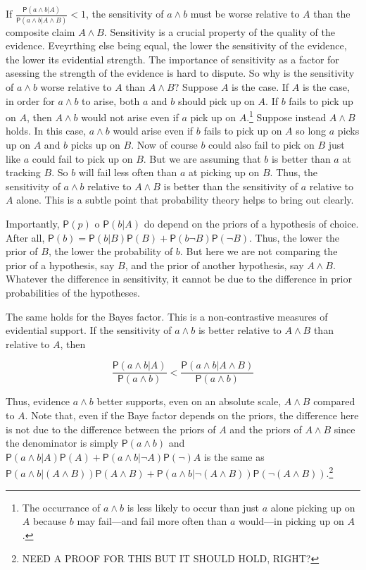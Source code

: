 \documentclass[10pt,dvipsnames,enabledeprecatedfontcommands]{scrartcl}
\newcommand{\pr}[1]{\mathsf{P}(#1)}
\begin{document}
If \(\frac{\pr{a\wedge b \vert A}}{\pr{a\wedge b \vert A \wedge B}}<1\),
the sensitivity of \(a\wedge b\) must be worse relative to \(A\) than
the composite claim \(A \wedge B\). Sensitivity is a crucial property of
the quality of the evidence. Eveyrthing else being equal, the lower the
sensitivity of the evidence, the lower its evidential strength. The
importance of sensitivity as a factor for asessing the strength of the
evidence is hard to dispute. So why is the sensitivity of \(a\wedge b\)
worse relative to \(A\) than \(A \wedge B\)? Suppose \(A\) is the case.
If \(A\) is the case, in order for \(a\wedge b\) to arise, both \(a\)
and \(b\) should pick up on \(A\). If \(b\) fails to pick up on \(A\),
then \(A \wedge b\) would not arise even if \(a\) pick up on
\(A\).\footnote{The occurrance of $a\wedge b$ is less likely to occur than just $a$ alone picking up on $A$ because $b$ may fail---and fail more often than $a$ would---in picking up on $A$.}
Suppose instead \(A\wedge B\) holds. In this case, \(a\wedge b\) would
arise even if \(b\) fails to pick up on \(A\) so long \(a\) picks up on
\(A\) and \(b\) picks up on \(B\). Now of course \(b\) could also fail
to pick on \(B\) just like \(a\) could fail to pick up on \(B\). But we
are assuming that \(b\) is better than \(a\) at tracking \(B\). So \(b\)
will fail less often than \(a\) at picking up on \(B\). Thus, the
sensitivity of \(a\wedge b\) relative to \(A\wedge B\) is better than
the sensitivity of \(a\) relative to \(A\) alone. This is a subtle point
that probability theory helps to bring out clearly.

Importantly, \(\pr{p}\) o \(\pr{b \vert A}\) do depend on the priors of
a hypothesis of choice. After all,
\(\pr{b}=\pr{b \vert B}\pr{B}+\pr{b \neg B}\pr{\neg B}\). Thus, the
lower the prior of \(B\), the lower the probability of \(b\). But here
we are not comparing the prior of a hypothesis, say \(B\), and the prior
of another hypothesis, say \(A \wedge B\). Whatever the difference in
sensitivity, it cannot be due to the difference in prior probabilities
of the hypotheses.

The same holds for the Bayes factor. This is a non-contrastive measures
of evidential support. If the sensitivity of \(a\wedge b\) is better
relative to \(A \wedge B\) than relative to \(A\), then

\[\frac{\pr{a\wedge b \vert A}}{\pr{a\wedge b}} < \frac{\pr{a\wedge b \vert A \wedge B}}{\pr{a\wedge b}}   \]

\noindent Thus, evidence \(a\wedge b\) better supports, even on an
absolute scale, \(A \wedge B\) compared to \(A\). Note that, even if the
Baye factor depends on the priors, the difference here is not due to the
difference between the priors of \(A\) and the priors of \(A\wedge B\)
since the denominator is simply \(\pr{a\wedge b}\) and
\(\pr{a\wedge b \vert A}\pr{A}+ \pr{a\wedge b \vert \neg A}\pr\neg {A}\)
is the same as
\(\pr{a\wedge b \vert (A\wedge B)}\pr{A\wedge B}+ \pr{a\wedge b \vert \neg (A\wedge B)}\pr{\neg (A\wedge B)}\).\footnote{NEED A PROOF FOR THIS BUT IT SHOULD HOLD, RIGHT?}
\end{document}
